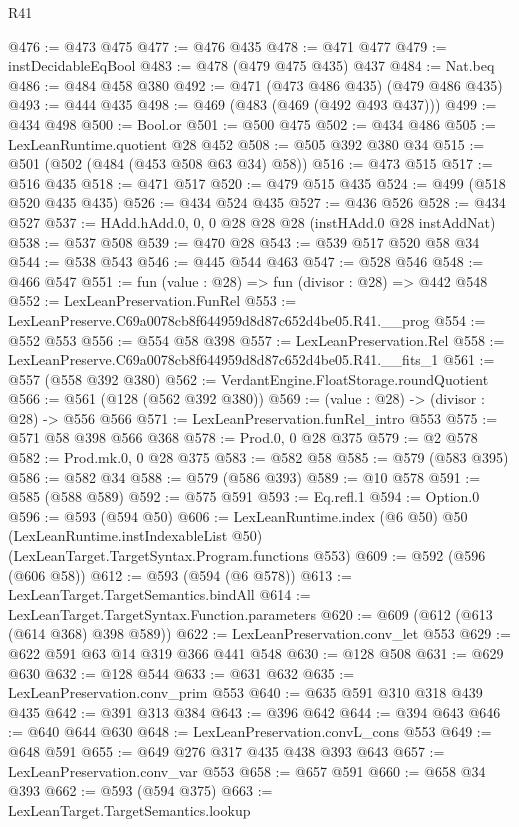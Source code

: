 \begin{lexlean}{R41}
\begin{coremodule}
@476 := @473 @475
@477 := @476 @435
@478 := @471 @477
@479 := instDecidableEqBool
@483 := @478 (@479 @475 @435) @437
@484 := Nat.beq
@486 := @484 @458 @380
@492 := @471 (@473 @486 @435) (@479 @486 @435)
@493 := @444 @435
@498 := @469 (@483 (@469 (@492 @493 @437)))
@499 := @434 @498
@500 := Bool.or
@501 := @500 @475
@502 := @434 @486
@505 := LexLeanRuntime.quotient @28 @452
@508 := @505 @392 @380 @34
@515 := @501 (@502 (@484 (@453 @508 @63 @34) @58))
@516 := @473 @515
@517 := @516 @435
@518 := @471 @517
@520 := @479 @515 @435
@524 := @499 (@518 @520 @435 @435)
@526 := @434 @524 @435
@527 := @436 @526
@528 := @434 @527
@537 := HAdd.hAdd.{0, 0, 0} @28 @28 @28 (instHAdd.{0} @28 instAddNat)
@538 := @537 @508
@539 := @470 @28
@543 := @539 @517 @520 @58 @34
@544 := @538 @543
@546 := @445 @544 @463
@547 := @528 @546
@548 := @466 @547
@551 := fun (value : @28) => fun (divisor : @28) => @442 @548
@552 := LexLeanPreservation.FunRel
@553 := LexLeanPreserve.C69a0078cb8f644959d8d87c652d4be05.R41.__prog
@554 := @552 @553
@556 := @554 @58 @398
@557 := LexLeanPreservation.Rel
@558 := LexLeanPreserve.C69a0078cb8f644959d8d87c652d4be05.R41.__fits_1
@561 := @557 (@558 @392 @380)
@562 := VerdantEngine.FloatStorage.roundQuotient
@566 := @561 (@128 (@562 @392 @380))
@569 := (value : @28) -> (divisor : @28) -> @556 @566
@571 := LexLeanPreservation.funRel_intro @553
@575 := @571 @58 @398 @566 @368
@578 := Prod.{0, 0} @28 @375
@579 := @2 @578
@582 := Prod.mk.{0, 0} @28 @375
@583 := @582 @58
@585 := @579 (@583 @395)
@586 := @582 @34
@588 := @579 (@586 @393)
@589 := @10 @578
@591 := @585 (@588 @589)
@592 := @575 @591
@593 := Eq.refl.{1}
@594 := Option.{0}
@596 := @593 (@594 @50)
@606 := LexLeanRuntime.index
    (@6 @50)
    @50
    (LexLeanRuntime.instIndexableList @50)
    (LexLeanTarget.TargetSyntax.Program.functions @553)
@609 := @592 (@596 (@606 @58))
@612 := @593 (@594 (@6 @578))
@613 := LexLeanTarget.TargetSemantics.bindAll
@614 := LexLeanTarget.TargetSyntax.Function.parameters
@620 := @609 (@612 (@613 (@614 @368) @398 @589))
@622 := LexLeanPreservation.conv_let @553
@629 := @622 @591 @63 @14 @319 @366 @441 @548
@630 := @128 @508
@631 := @629 @630
@632 := @128 @544
@633 := @631 @632
@635 := LexLeanPreservation.conv_prim @553
@640 := @635 @591 @310 @318 @439 @435
@642 := @391 @313 @384
@643 := @396 @642
@644 := @394 @643
@646 := @640 @644 @630
@648 := LexLeanPreservation.convL_cons @553
@649 := @648 @591
@655 := @649 @276 @317 @435 @438 @393 @643
@657 := LexLeanPreservation.conv_var @553
@658 := @657 @591
@660 := @658 @34 @393
@662 := @593 (@594 @375)
@663 := LexLeanTarget.TargetSemantics.lookup

\end{coremodule}
\end{lexlean}
